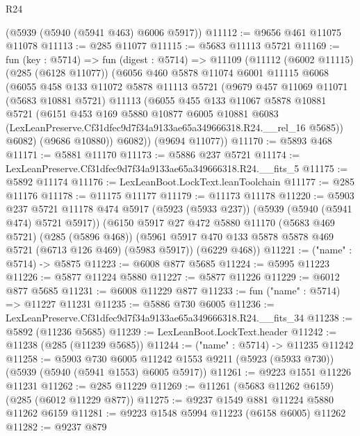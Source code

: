 \begin{lexlean}{R24}
\begin{coremodule}
    (@5939 (@5940 (@5941 @463) @6006 @5917))
@11112 := @9656 @461 @11075 @11078
@11113 := @285 @11077
@11115 := @5683 @11113 @5721
@11169 := fun (key : @5714) =>
  fun (digest : @5714) =>
  @11109
    (@11112
      (@6002 @11115)
      (@285 (@6128 @11077))
      (@6056
        @460
        @5878
        @11074
        @6001
        @11115
        @6068
        (@6055
          @458
          @133
          @11072
          @5878
          @11113
          @5721
          (@9679
            @457
            @11069
            @11071
            (@5683 @10881 @5721)
            @11113
            (@6055
              @455
              @133
              @11067
              @5878
              @10881
              @5721
              (@6151
                @453
                @169
                @5880
                @10877
                @6005
                @10881
                @6083
                (LexLeanPreserve.Cf31dfec9d7f34a9133ae65a349666318.R24.__rel_16 @5685))
              @6082)
            (@9686 @10880))
          @6082))
      (@9694 @11077))
@11170 := @5893 @468
@11171 := @5881 @11170
@11173 := @5886 @237 @5721
@11174 := LexLeanPreserve.Cf31dfec9d7f34a9133ae65a349666318.R24.__fits_5
@11175 := @5892 @11174
@11176 := LexLeanBoot.LockText.leanToolchain
@11177 := @285 @11176
@11178 := @11175 @11177
@11179 := @11173 @11178
@11220 := @5903
    @237
    @5721
    @11178
    @474
    @5917
    (@5923 (@5933 @237))
    (@5939 (@5940 (@5941 @474) @5721 @5917))
    (@6150
      @5917
      @27
      @472
      @5880
      @11170
      (@5683 @469 @5721)
      (@285 (@5896 @468))
      (@5961 @5917 @470 @133 @5878 @5878 @469 @5721 (@6713 @126 @469) (@5983 @5917))
      (@6229 @468))
@11221 := ("name" : @5714) -> @5875
@11223 := @6008 @877 @5685
@11224 := @5995 @11223
@11226 := @5877 @11224 @5880
@11227 := @5877 @11226
@11229 := @6012 @877 @5685
@11231 := @6008 @11229 @877
@11233 := fun ("name" : @5714) => @11227 @11231
@11235 := @5886 @730 @6005
@11236 := LexLeanPreserve.Cf31dfec9d7f34a9133ae65a349666318.R24.__fits_34
@11238 := @5892 (@11236 @5685)
@11239 := LexLeanBoot.LockText.header
@11242 := @11238 (@285 (@11239 @5685))
@11244 := ("name" : @5714) -> @11235 @11242
@11258 := @5903
    @730
    @6005
    @11242
    @1553
    @9211
    (@5923 (@5933 @730))
    (@5939 (@5940 (@5941 @1553) @6005 @5917))
@11261 := @9223 @1551 @11226 @11231
@11262 := @285 @11229
@11269 := @11261 (@5683 @11262 @6159) (@285 (@6012 @11229 @877))
@11275 := @9237 @1549 @881 @11224 @5880 @11262 @6159
@11281 := @9223 @1548 @5994 @11223 (@6158 @6005) @11262
@11282 := @9237 @879

\end{coremodule}
\end{lexlean}

